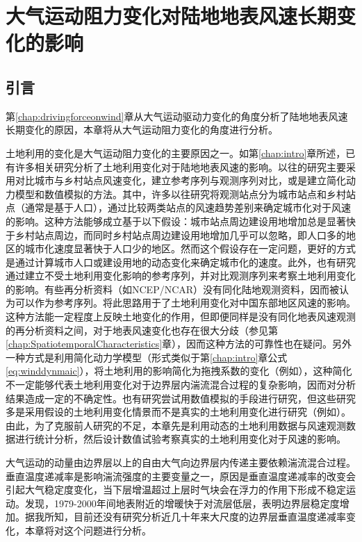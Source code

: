 \chapter{大气运动阻力变化对陆地地表风速长期变化的影响}\label{chap:dragingforceonwind}

\section{引言}

第\ref{chap:drivingforceonwind}章从大气运动驱动力变化的角度分析了陆地地表风速长期变化的原因，本章将从大气运动阻力变化的角度进行分析。

土地利用的变化是大气运动阻力变化的主要原因之一。如第\ref{chap:intro}章所述，已有许多相关研究分析了土地利用变化对于陆地地表风速的影响\citep{vautard2010northern, wu2016estimating, kalnay2003impact, guo2011changes}。以往的研究主要采用对比城市与乡村站点风速变化，建立参考序列与观测序列对比，或是建立简化动力模型和数值模拟的方法。其中，许多以往研究将观测站点分为城市站点和乡村站点（通常是基于人口），通过比较两类站点的风速趋势差别来确定城市化对于风速的影响\citep{guo2011changes}。这种方法能够成立基于以下假设：城市站点周边建设用地增加总是显著快于乡村站点周边，而同时乡村站点周边建设用地增加几乎可以忽略，即人口多的地区的城市化速度显著快于人口少的地区。然而这个假设存在一定问题，更好的方式是通过计算城市人口或建设用地的动态变化来确定城市化的速度。此外，也有研究通过建立不受土地利用变化影响的参考序列，并对比观测序列来考察土地利用变化的影响。有些再分析资料（如NCEP/NCAR）没有同化陆地观测资料，因而被认为可以作为参考序列\citep{kalnay2003impact}。\citet{zha2017effects}将此思路用于了土地利用变化对中国东部地区风速的影响。这种方法能一定程度上反映土地变化的作用，但即便同样是没有同化地表风速观测的再分析资料之间，对于地表风速变化也存在很大分歧（参见第\ref{chap:SpatiotemporalCharacteristics}章），因而这种方法的可靠性也在疑问。另外一种方式是利用简化动力学模型（形式类似于第\ref{chap:intro}章公式 \ref{eq:winddynmaic}），将土地利用的影响简化为拖拽系数的变化（例如\citet{wu2016estimating}），这种简化不一定能够代表土地利用变化对于边界层内湍流混合过程的复杂影响，因而对分析结果造成一定的不确定性。也有研究尝试用数值模拟的手段进行研究，但这些研究多是采用假设的土地利用变化情景而不是真实的土地利用变化进行研究（例如\citet{vautard2010northern}）。由此，为了克服前人研究的不足，本章先是利用动态的土地利用数据与风速观测数据进行统计分析，然后设计数值试验考察真实的土地利用变化对于风速的影响。

大气运动的动量由边界层以上的自由大气向边界层内传递主要依赖湍流混合过程。垂直温度递减率是影响湍流强度的主要变量之一，原因是垂直温度递减率的改变会引起大气稳定度变化，当下层增温超过上层时气块会在浮力的作用下形成不稳定运动\citep{J2004An}。\citet{gaffen2000multidecadal}发现，1979-2000年间地表附近的增暖快于对流层低层，表明边界层稳定度增加。据我所知，目前还没有研究分析近几十年来大尺度的边界层垂直温度递减率变化，本章将对这个问题进行分析。

